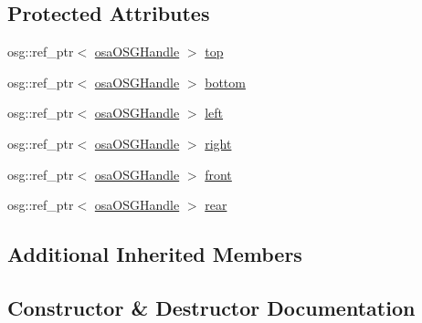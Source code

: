 \subsection*{Protected Attributes}
\begin{DoxyCompactItemize}
\item 
osg\+::ref\+\_\+ptr$<$ \hyperlink{classosa_o_s_g_handle}{osa\+O\+S\+G\+Handle} $>$ \hyperlink{classosa_o_s_g_body_u_i_a5737e52da9fa403eee45b672873e51c1}{top}
\item 
osg\+::ref\+\_\+ptr$<$ \hyperlink{classosa_o_s_g_handle}{osa\+O\+S\+G\+Handle} $>$ \hyperlink{classosa_o_s_g_body_u_i_a83f9d28bb8372a0e6772fcef3217e132}{bottom}
\item 
osg\+::ref\+\_\+ptr$<$ \hyperlink{classosa_o_s_g_handle}{osa\+O\+S\+G\+Handle} $>$ \hyperlink{classosa_o_s_g_body_u_i_a850b2ab2b5a8bd278ad22c00a6313502}{left}
\item 
osg\+::ref\+\_\+ptr$<$ \hyperlink{classosa_o_s_g_handle}{osa\+O\+S\+G\+Handle} $>$ \hyperlink{classosa_o_s_g_body_u_i_a7cda4d7ffa7040ba452edd7e31ebf6f5}{right}
\item 
osg\+::ref\+\_\+ptr$<$ \hyperlink{classosa_o_s_g_handle}{osa\+O\+S\+G\+Handle} $>$ \hyperlink{classosa_o_s_g_body_u_i_adae724839022e0f6dffdad27939da0f2}{front}
\item 
osg\+::ref\+\_\+ptr$<$ \hyperlink{classosa_o_s_g_handle}{osa\+O\+S\+G\+Handle} $>$ \hyperlink{classosa_o_s_g_body_u_i_aa32fb4a77a38fdefe326191750129319}{rear}
\end{DoxyCompactItemize}
\subsection*{Additional Inherited Members}


\subsection{Constructor \& Destructor Documentation}
\hypertarget{classosa_o_s_g_body_u_i_a447d7ecccd2158c0ee9558df22997638}{}
